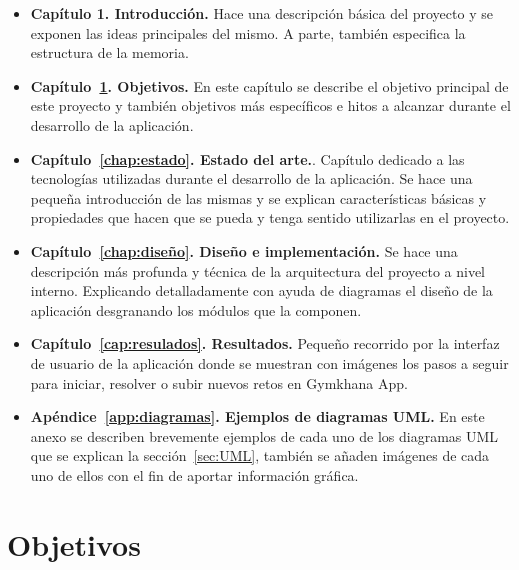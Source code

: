 \documentclass[a4paper, 12pt]{book}
\begin{document}
\begin{itemize}
  \item \textbf{Capítulo 1. Introducción.} Hace una descripción básica del proyecto y se exponen las ideas principales del mismo. A parte, también especifica la estructura de la memoria. 
  
  \item \textbf{Capítulo~\ref{chap:objetivos}. Objetivos.} En este capítulo se describe el objetivo principal de este proyecto y también objetivos más específicos e hitos a alcanzar durante el desarrollo de la aplicación.
  
  \item \textbf{Capítulo~\ref{chap:estado}. Estado del arte.}. Capítulo dedicado a las tecnologías utilizadas durante el desarrollo de la aplicación. Se hace una pequeña introducción de las mismas y se explican características básicas y propiedades que hacen que se pueda y tenga sentido utilizarlas en el proyecto.
  
  \item \textbf{Capítulo~\ref{chap:diseño}. Diseño e implementación.} Se hace una descripción más profunda y técnica de la arquitectura del proyecto a nivel interno. Explicando detalladamente con ayuda de diagramas el diseño de la aplicación desgranando los módulos que la componen.
  
  \item \textbf{Capítulo~\ref{cap:resulados}. Resultados.} Pequeño recorrido por la interfaz de usuario de la aplicación donde se muestran con imágenes los pasos a seguir para iniciar, resolver o subir nuevos retos en Gymkhana App. 
  
   \item \textbf{Apéndice~\ref{app:diagramas}. Ejemplos de diagramas UML.} En este anexo se describen brevemente ejemplos de cada uno de los diagramas UML que se explican la sección~\ref{sec:UML}, también se añaden imágenes de cada uno de ellos con el fin de aportar información gráfica.
\end{itemize}



\cleardoublepage %
\chapter{Objetivos} %
\label{chap:objetivos} %
\end{document}
